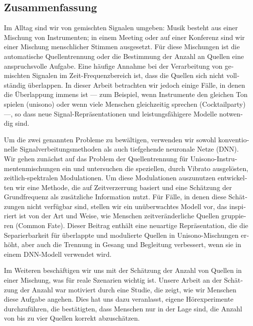 \begin{otherlanguage}{ngerman}
\chapter*{Zusammenfassung}

\begin{small}
Im Alltag sind wir von gemischten Signalen umgeben: Musik besteht aus einer Mischung von Instrumenten; in einem Meeting oder auf einer Konferenz sind wir einer Mischung menschlicher Stimmen ausgesetzt.
Für diese Mischungen ist die automatische Quellentrennung oder die Bestimmung der Anzahl an Quellen eine anspruchsvolle Aufgabe.
Eine häufige Annahme bei der Verarbeitung von gemischten Signalen im Zeit-Frequenzbereich ist, dass die Quellen sich nicht vollständig überlappen.
In dieser Arbeit betrachten wir jedoch einige Fälle, in denen die Überlappung immens ist --- zum Beispiel, wenn Instrumente den gleichen Ton spielen (unisono) oder wenn viele Menschen gleichzeitig sprechen (Cocktailparty) ---, so dass neue Signal-Repräsentationen und leistungsfähigere Modelle notwendig sind.
\par
Um die zwei genannten Probleme zu bewältigen, verwenden wir sowohl konventionelle Signalverbeitungsmethoden als auch tiefgehende neuronale Netze (DNN).
Wir gehen zunächst auf das Problem der Quellentrennung für Unisono-Instrumentenmischungen ein und untersuchen die speziellen, durch Vibrato ausgelösten, zeitlich-spektralen Modulationen.
Um diese Modulationen auszunutzen entwickelten wir eine Methode, die auf Zeitverzerrung basiert und eine Schätzung der Grundfrequenz als zusätzliche Information nutzt.
Für Fälle, in denen diese Schätzungen nicht verfügbar sind, stellen wir ein unüberwachtes Modell vor, das inspiriert ist von der Art und Weise, wie Menschen zeitveränderliche Quellen gruppieren (Common Fate).
Dieser Beitrag enthält eine neuartige Repräsentation, die die Separierbarkeit für überlappte und modulierte Quellen in Unisono-Mischungen erhöht, aber auch die Trennung in Gesang und Begleitung verbessert, wenn sie  in einem DNN-Modell verwendet wird.
\par
Im Weiteren beschäftigen wir uns mit der Schätzung der Anzahl von Quellen in einer Mischung, was für reale Szenarien wichtig ist.
Unsere Arbeit an der Schätzung der Anzahl war motiviert durch eine Studie, die zeigt, wie wir Menschen diese Aufgabe angehen.
Dies hat uns dazu veranlasst, eigene Hörexperimente durchzuführen, die bestätigten, dass Menschen nur in der Lage sind, die Anzahl von bis zu vier Quellen korrekt abzuschätzen.

\end{small}
\end{otherlanguage}

